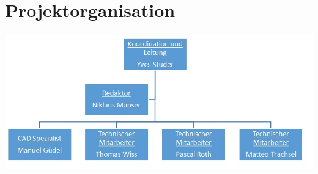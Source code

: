 \section{Projektorganisation}
    \includegraphics[width=1.05\textwidth]{Sourcen/Organisation/Bilder/ProjektOrganisation.jpg}